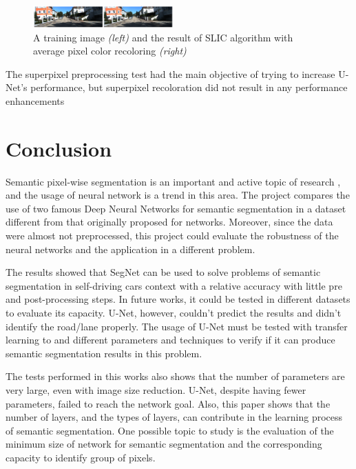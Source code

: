 \documentclass[10pt,twocolumn,letterpaper]{article}
\begin{document}
\begin{figure}[ht]
  \centering
  \includegraphics[width=0.48\textwidth]{kitti_superpixels.png}
  \caption{A training image \textit{(left)} and the result of SLIC algorithm with average pixel color recoloring \textit{(right)}}
  \label{fig:kitt_superpixels}
\end{figure} 

The superpixel preprocessing test had the main objective of trying to increase U-Net's performance, but superpixel recoloration did not result in any performance enhancements

\section{Conclusion} \label{sec:conclusion}


Semantic pixel-wise segmentation is an important and active topic of research \cite{SEGNET}, and the usage of neural network is a trend in this area. The project compares the use of two famous Deep Neural Networks for semantic segmentation in a dataset different from that originally proposed for networks. Moreover, since the data were almost not preprocessed, this project could evaluate the robustness of the neural networks and the application in a different problem.

The results showed that SegNet can be used to solve problems of semantic segmentation in self-driving cars context with a relative accuracy with little pre and post-processing steps. In future works, it could be tested in different datasets to evaluate its capacity. U-Net, however, couldn't predict the results and didn't identify the road/lane properly. The usage of U-Net must be tested with transfer learning to and different parameters and techniques to verify if it can produce semantic segmentation results in this problem.

The tests performed in this works also shows that the number of parameters are very large, even with image size reduction. U-Net, despite having fewer parameters, failed to reach the network goal. Also, this paper shows that the number of layers, and the types of layers, can contribute in the learning process of semantic segmentation. One possible topic to study is the evaluation of the minimum size of network for semantic segmentation and the corresponding capacity to identify group of pixels.
\end{document}
